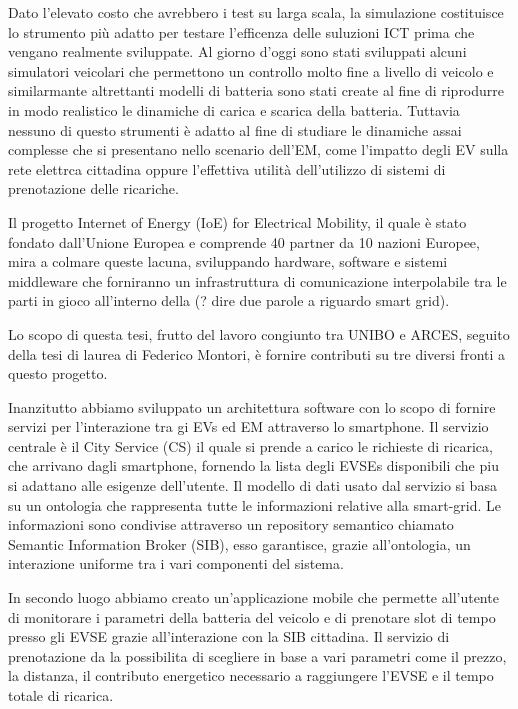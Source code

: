 Dato l'elevato costo che avrebbero i test su larga scala, la simulazione costituisce lo strumento più adatto
per testare l'efficenza delle suluzioni ICT prima che vengano realmente sviluppate. Al giorno d'oggi sono stati
sviluppati alcuni simulatori veicolari che permettono un controllo molto fine a livello di veicolo e similarmante
altrettanti modelli di batteria sono stati create al fine di riprodurre in modo realistico le dinamiche di carica e
scarica della batteria.
Tuttavia nessuno di questo strumenti è adatto al fine di studiare le dinamiche assai complesse che si presentano 
nello scenario dell'EM, come l'impatto degli EV sulla rete elettrca cittadina oppure l'effettiva
utilità dell'utilizzo di sistemi di prenotazione delle ricariche. 

Il progetto Internet of Energy (IoE) for Electrical Mobility, il quale è stato fondato dall'Unione Europea
e comprende 40 partner da 10 nazioni Europee, mira a colmare queste lacuna, sviluppando hardware, software 
e sistemi middleware che forniranno un infrastruttura di comunicazione interpolabile tra le parti in gioco
all'interno della (? dire due parole a riguardo smart grid).

Lo scopo di questa tesi, frutto del lavoro congiunto tra UNIBO e ARCES, seguito della tesi di laurea di 
Federico Montori, è fornire contributi su tre diversi fronti a questo progetto. 

Inanzitutto abbiamo sviluppato un architettura software con lo scopo di fornire servizi per l'interazione
tra gi EVs ed EM attraverso lo smartphone. Il servizio centrale è il City Service (CS) il quale
si prende a carico le richieste di ricarica, che arrivano dagli smartphone, fornendo la lista degli EVSEs 
disponibili che piu si adattano alle esigenze dell'utente. Il modello di dati usato dal servizio si basa
su un ontologia che rappresenta tutte le informazioni relative alla smart-grid. Le informazioni sono condivise
attraverso un repository semantico chiamato Semantic Information Broker (SIB), esso garantisce, grazie all'ontologia,
un interazione uniforme tra i vari componenti del sistema.

In secondo luogo abbiamo creato un'applicazione mobile che permette all'utente di monitorare i parametri
della batteria del veicolo e di prenotare slot di tempo presso gli EVSE grazie all'interazione con la 
SIB cittadina. Il servizio di prenotazione da la possibilita di scegliere in base a vari parametri come il prezzo, 
la distanza, il contributo energetico necessario a raggiungere l'EVSE e il tempo totale di ricarica.

